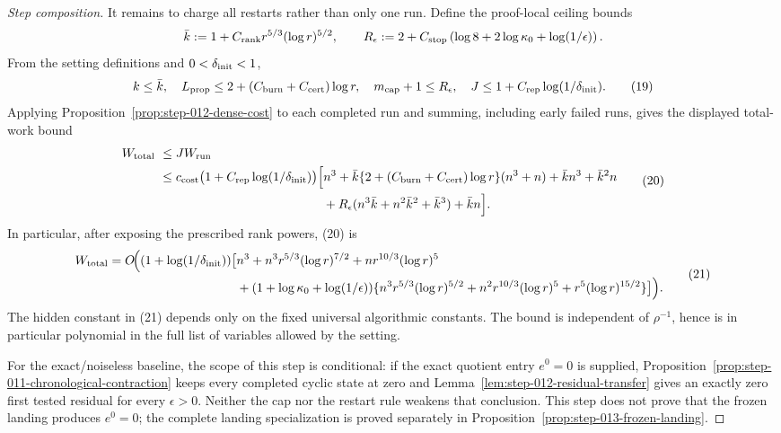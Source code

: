 \begin{proof}[Step composition]
It remains to charge all restarts rather than only one run.  Define the
proof-local ceiling bounds
\[
 \bar k:=1+C_{\rm rank}r^{5/3}(\log r)^{5/2},\qquad
 R_\epsilon:=2+C_{\rm stop}
 \left(\log8+2\log\kappa_0+\log(1/\epsilon)\right).
\]
From the setting definitions and \(0<\delta_{\rm init}<1\),
\[
 k\le\bar k,\quad
 L_{\rm prop}\le2+(C_{\rm burn}+C_{\rm cert})\log r,\quad
 m_{\rm cap}+1\le R_\epsilon,\quad
 J\le1+C_{\rm rep}\log(1/\delta_{\rm init}).
\tag{19}
\]
Applying Proposition~\ref{prop:step-012-dense-cost} to each completed run
and summing, including early failed runs, gives the displayed total-work
bound
\[
\begin{aligned}
 W_{\rm total}\ &\le J W_{\rm run}\\
 &\le c_{\rm cost}\bigl(1+C_{\rm rep}\log(1/\delta_{\rm init})\bigr)
 \Big[ n^3
 +\bar k\{2+(C_{\rm burn}+C_{\rm cert})\log r\}(n^3+n)
 +\bar k n^3+\bar k^2n\\
 &\hspace{46mm}
 +R_\epsilon(n^3\bar k+n^2\bar k^2+\bar k^3)+\bar k n\Big].
\end{aligned}
\tag{20}
\]
In particular, after exposing the prescribed rank powers, (20) is
\[
\begin{aligned}
 W_{\rm total}=O\!\Big((1+\log(1/\delta_{\rm init}))\big[&n^3
 +n^3r^{5/3}(\log r)^{7/2}+nr^{10/3}(\log r)^5\\
 &+(1+\log\kappa_0+\log(1/\epsilon))
 \{n^3r^{5/3}(\log r)^{5/2}
 +n^2r^{10/3}(\log r)^5+r^5(\log r)^{15/2}\}\big]\Big).
\end{aligned}
\tag{21}
\]
The hidden constant in (21) depends only on the fixed universal algorithmic
constants.  The bound is independent of \(\rho^{-1}\), hence is in
particular polynomial in the full list of variables allowed by the setting.

For the exact/noiseless baseline, the scope of this step is conditional: if
the exact quotient entry \(e^0=0\) is supplied,
Proposition~\ref{prop:step-011-chronological-contraction} keeps every completed
cyclic state at zero and Lemma~\ref{lem:step-012-residual-transfer} gives an
exactly zero first tested residual for every \(\epsilon>0\).  Neither the cap
nor the restart rule weakens that conclusion.  This step does not prove that
the frozen landing produces \(e^0=0\); the complete landing specialization is
proved separately in Proposition~\ref{prop:step-013-frozen-landing}.
\end{proof}

